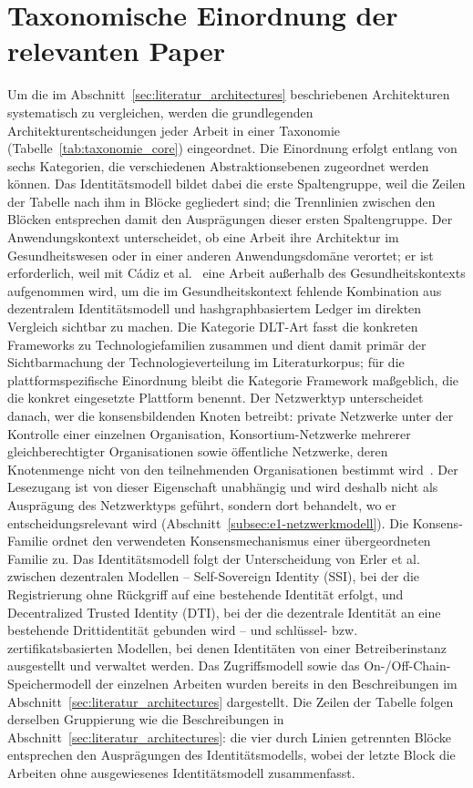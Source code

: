 \section{Taxonomische Einordnung der relevanten Paper}
\label{sec:literatur_architekturvergleich}

Um die im Abschnitt~\ref{sec:literatur_architectures} beschriebenen Architekturen systematisch zu vergleichen, werden die grundlegenden Architekturentscheidungen jeder Arbeit in einer Taxonomie (Tabelle~\ref{tab:taxonomie_core}) eingeordnet. Die Einordnung erfolgt entlang von sechs Kategorien, die verschiedenen Abstraktionsebenen zugeordnet werden können. Das Identitätsmodell bildet dabei die erste Spaltengruppe, weil die Zeilen der Tabelle nach ihm in Blöcke gegliedert sind; die Trennlinien zwischen den Blöcken entsprechen damit den Ausprägungen dieser ersten Spaltengruppe. Der Anwendungskontext unterscheidet, ob eine Arbeit ihre Architektur im Gesundheitswesen oder in einer anderen Anwendungsdomäne verortet; er ist erforderlich, weil mit Cádiz et al.~\cite{cadiz2025} eine Arbeit außerhalb des Gesundheitskontexts aufgenommen wird, um die im Gesundheitskontext fehlende Kombination aus dezentralem Identitätsmodell und hashgraphbasiertem Ledger im direkten Vergleich sichtbar zu machen. Die Kategorie DLT-Art fasst die konkreten Frameworks zu Technologiefamilien zusammen und dient damit primär der Sichtbarmachung der Technologieverteilung im Literaturkorpus; für die plattformspezifische Einordnung bleibt die Kategorie Framework maßgeblich, die die konkret eingesetzte Plattform benennt. Der Netzwerktyp unterscheidet danach, wer die konsensbildenden Knoten betreibt: private Netzwerke unter der Kontrolle einer einzelnen Organisation, Konsortium-Netzwerke mehrerer gleichberechtigter Organisationen sowie öffentliche Netzwerke, deren Knotenmenge nicht von den teilnehmenden Organisationen bestimmt wird~\cite{ferdous2020}. Der Lesezugang ist von dieser Eigenschaft unabhängig und wird deshalb nicht als Ausprägung des Netzwerktyps geführt, sondern dort behandelt, wo er entscheidungsrelevant wird (Abschnitt~\ref{subsec:e1-netzwerkmodell}). Die Konsens-Familie ordnet den verwendeten Konsensmechanismus einer übergeordneten Familie zu. Das Identitätsmodell folgt der Unterscheidung von Erler et al.~\cite{erler2024} zwischen dezentralen Modellen -- Self-Sovereign Identity (SSI), bei der die Registrierung ohne Rückgriff auf eine bestehende Identität erfolgt, und Decentralized Trusted Identity (DTI), bei der die dezentrale Identität an eine bestehende Drittidentität gebunden wird -- und schlüssel- bzw. zertifikatsbasierten Modellen, bei denen Identitäten von einer Betreiberinstanz ausgestellt und verwaltet werden. Das Zugriffsmodell sowie das On-/Off-Chain-Speichermodell der einzelnen Arbeiten wurden bereits in den Beschreibungen im Abschnitt~\ref{sec:literatur_architectures} dargestellt. Die Zeilen der Tabelle folgen derselben Gruppierung wie die Beschreibungen in Abschnitt~\ref{sec:literatur_architectures}: die vier durch Linien getrennten Blöcke entsprechen den Ausprägungen des Identitätsmodells, wobei der letzte Block die Arbeiten ohne ausgewiesenes Identitätsmodell zusammenfasst.

